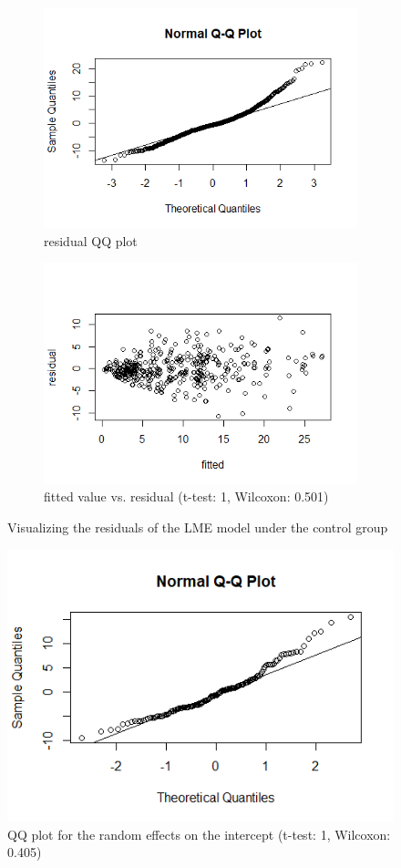 \begin{figure}[H]
\begin{subfigure}{.5\textwidth}
  \centering
  \includegraphics[width=1\linewidth]{../../plots/qq_residual_control.png}
  \caption{residual QQ plot}
\end{subfigure}
\begin{subfigure}{.5\textwidth}
  \centering
  \includegraphics[width=1\linewidth]{../../plots/residual_control.png}
  \caption{fitted value vs. residual (t-test: 1, Wilcoxon: 0.501)}
\end{subfigure}
\caption{Visualizing the residuals of the LME model under the control group}
\label{fig:residual.control}
\end{figure}

\begin{figure}[H]
\centering
\includegraphics[width=0.5\linewidth]{../../plots/qq_intercept_treatment.png}
\caption{QQ plot for the random effects on the intercept (t-test: 1, Wilcoxon: 0.405)}
\label{fig:re.control}
\end{figure}

